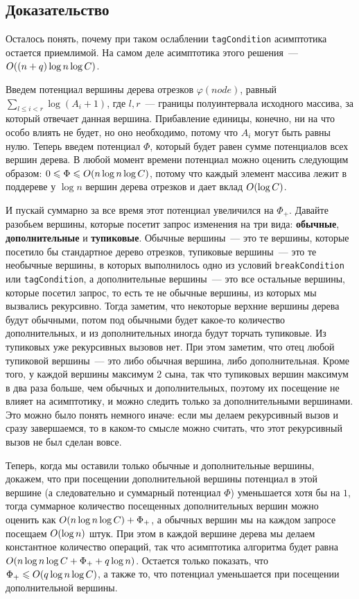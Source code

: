 \subsection{Доказательство}

Осталось понять, почему при таком ослаблении \verb+tagCondition+ асимптотика остается приемлимой. На самом деле асимптотика этого решения~--- $O((n + q) \log n \log C)$.

Введем потенциал вершины дерева отрезков $\varphi(node)$, равный $\sum_{l \le i < r} \log (A_i + 1)$, где $l, r$~--- границы полуинтервала исходного массива, за который отвечает данная вершина. Прибавление единицы, конечно, ни на что особо влиять не будет, но оно необходимо, потому что $A_i$ могут быть равны нулю.
Теперь введем потенциал $\Phi$, который будет равен сумме потенциалов всех вершин дерева. В любой момент времени потенциал можно оценить следующим образом: $0 \leqslant \Phi \leqslant O(n \log n \log C)$, потому что каждый элемент массива лежит в поддереве у $\log n$ вершин дерева отрезков и дает вклад $O(\log C)$.

И пускай суммарно за все время этот потенциал увеличился на $\Phi_+$. Давайте разобьем вершины, которые посетит запрос изменения на три вида: \textbf{обычные}, \textbf{дополнительные} и \textbf{тупиковые}.
Обычные вершины~--- это те вершины, которые посетило бы стандартное дерево отрезков, тупиковые вершины~--- это те необычные вершины, в которых выполнилось одно из условий \verb+breakCondition+ или \verb+tagCondition+, а дополнительные вершины~--- это все остальные вершины, которые посетил запрос, то есть те не обычные вершины, из которых мы вызвались рекурсивно.
Тогда заметим, что некоторые верхние вершины дерева будут обычными, потом под обычными будет какое-то количество дополнительных, и из дополнительных иногда будут торчать тупиковые. Из тупиковых уже рекурсивных вызовов нет.
При этом заметим, что отец любой тупиковой вершины~--- это либо обычная вершина, либо дополнительная. Кроме того, у каждой вершины максимум $2$ сына, так что тупиковых вершин максимум в два раза больше, чем обычных и дополнительных, поэтому их посещение не влияет на асимптотику, и можно следить только за дополнительными вершинами. Это можно было понять немного иначе: если мы делаем рекурсивный вызов и сразу завершаемся, то в каком-то смысле можно считать, что этот рекурсивный вызов не был сделан вовсе.

Теперь, когда мы оставили только обычные и дополнительные вершины, докажем, что при посещении дополнительной вершины потенциал в этой вершине (а следовательно и суммарный потенциал $\Phi$) уменьшается хотя бы на $1$, тогда суммарное количество посещенных дополнительных вершин можно оценить как $O(n \log n \log C) + \Phi_+$, а обычных вершин мы на каждом запросе посещаем $O(\log n)$ штук. При этом в каждой вершине дерева мы делаем константное количество операций, так что асимптотика алгоритма будет равна $O(n \log n \log C + \Phi_+ + q \log n)$. Остается только показать, что $\Phi_+ \leqslant O(q \log n \log C)$, а также то, что потенциал уменьшается при посещении дополнительной вершины.

